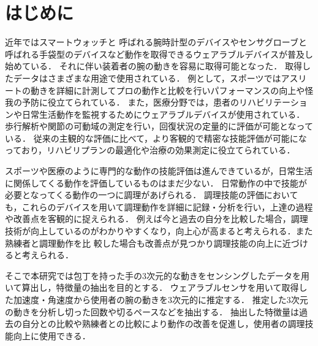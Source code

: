 \section{はじめに}
近年ではスマートウォッチと
呼ばれる腕時計型のデバイスやセンサグローブと呼ばれる手袋型のデバイスなど動作を取得できるウェアラブルデバイスが普及し始めている．
それに伴い装着者の腕の動きを容易に取得可能となった．
取得したデータはさまざまな用途で使用されている．
例として，スポーツではアスリートの動きを詳細に計測してプロの動作と比較を行いパフォーマンスの向上や怪我の予防に役立てられている．
また，医療分野では，患者のリハビリテーションや日常生活動作を監視するためにウェアラブルデバイスが使用されている．
歩行解析や関節の可動域の測定を行い，回復状況の定量的に評価が可能となっている．
従来の主観的な評価に比べて，より客観的で精密な技能評価が可能になっており，リハビリプランの最適化や治療の効果測定に役立てられている．

スポーツや医療のように専門的な動作の技能評価は進んできているが，日常生活に関係してくる動作を評価しているものはまだ少ない．
日常動作の中で技能が必要となってくる動作の一つに調理があげられる．
調理技能の評価においても，これらのデバイスを用いて調理動作を詳細に記録・分析を行い，上達の過程や改善点を客観的に捉えられる．
例えば今と過去の自分を比較した場合，調理技術が向上しているのがわかりやすくなり，向上心が高まると考えられる．また熟練者と調理動作を比
較した場合も改善点が見つかり調理技能の向上に近づけると考えられる．

そこで本研究では包丁を持った手の3次元的な動きをセンシングしたデータを用いて算出し，特徴量の抽出を目的とする．
ウェアラブルセンサを用いて取得した加速度・角速度から使用者の腕の動きを3次元的に推定する．
推定した3次元の動きを分析し切った回数や切るペースなどを抽出する．
抽出した特徴量は過去の自分との比較や熟練者との比較により動作の改善を促進し，使用者の調理技能向上に使用できる．